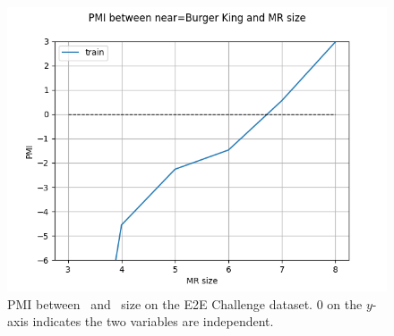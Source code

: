 \begin{figure}[t]
\centering
    \includegraphics[scale=0.5]{nlg/nearbk.png}
\caption{PMI between ~and \meaningrepresentation~size
on the E2E Challenge dataset. 0 on the $y$-axis indicates the two variables are independent.}
\label{fig:bkpmi}
\end{figure}
